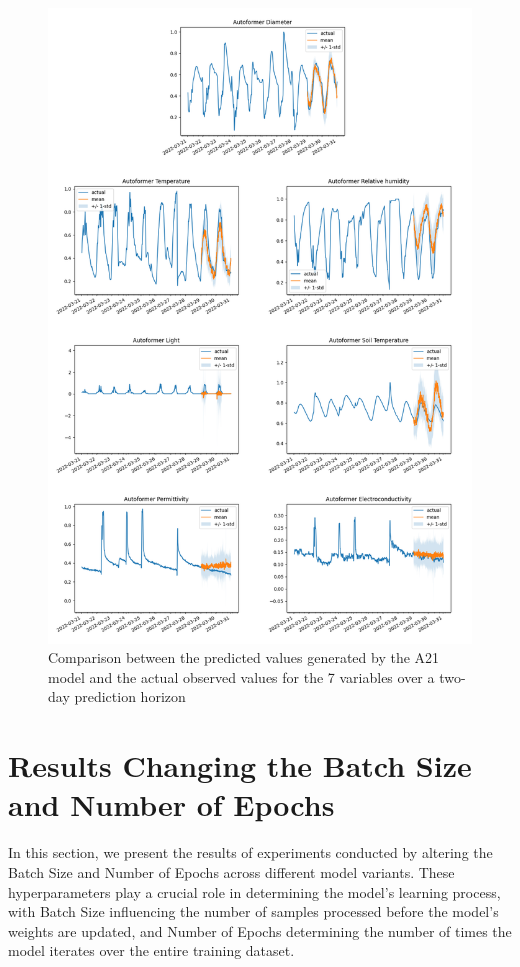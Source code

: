 \begin{figure}[htbp]
    \centering
    \includegraphics[width=15 cm]{6_ChapterResults/figuras/A21.png}
    \caption{Comparison between the predicted values generated by the A21 model and the actual observed values for the 7 variables over a two-day prediction horizon}
    \label{A21}
\end{figure}

\section{Results Changing the Batch Size and Number of Epochs}
In this section, we present the results of experiments conducted by altering the Batch Size and Number of Epochs across different model variants. These hyperparameters play a crucial role in determining the model's learning process, with Batch Size influencing the number of samples processed before the model’s weights are updated, and Number of Epochs determining the number of times the model iterates over the entire training dataset.


